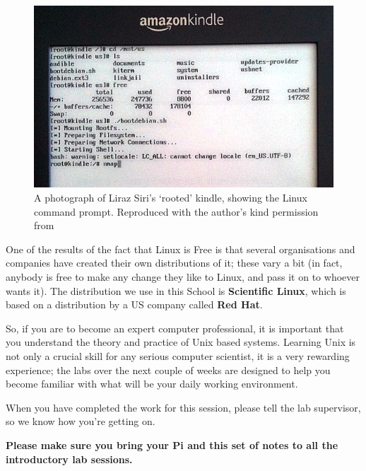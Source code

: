 \begin{figure}[h!tb]
  \begin{center}
    \includegraphics[width=13cm]{images/kindleroot}
  \end{center}
\caption{A photograph of Liraz Siri's `rooted' kindle, showing the Linux command prompt. Reproduced with the author's kind permission from }
\label{fig:kindlelinux}
\end{figure}

One of the results of the fact that Linux is Free is that several
organisations and companies have created their own distributions of
it; these vary a bit (in fact, anybody is free to make any change they
like to Linux, and pass it on to whoever wants it). The distribution
we use in this School is \textbf{Scientific Linux}, which is
based on a distribution by a
US company called \textbf{Red Hat}.

So, if you are to become an expert computer professional, it is
important that you understand the theory and practice of Unix based
systems. Learning Unix is not only a crucial skill for any serious
computer scientist, it is a very rewarding experience; the labs over
the next couple of weeks are designed to help you become familiar with what will be your daily working environment.

When you have completed the work for this session, please tell the lab supervisor, so we know how you're getting on.

\textbf{Please make sure you bring your Pi and this set of notes to all the introductory lab sessions.}
